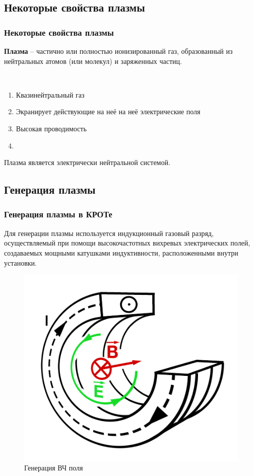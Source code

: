 \documentclass[10pt,pdf,hyperref={unicode}, dvipsnames]{beamer}
\begin{document}
\subsection{Некоторые свойства плазмы}
\begin{frame}
	\frametitle{Некоторые свойства плазмы}
	\textbf{Плазма} -- частично или полностью ионизированный газ, образованный из нейтральных атомов (или молекул) и заряженных частиц.

	$\,$
	\begin{enumerate}
		\item Квазинейтральный газ
		\item Экранирует действующие на неё на неё электрические поля
		\item Высокая проводимость
		\item 
	\end{enumerate}
	Плазма является электрически нейтральной системой.
\end{frame}

\subsection{Генерация плазмы}
\begin{frame}
	\frametitle{Генерация плазмы в КРОТе}
	Для генерации плазмы используется индукционный газовый разряд, осуществляемый при помощи высокочастотных вихревых электрических
	полей, создаваемых мощными катушками индуктивности, расположенными внутри установки.
	\begin{figure}[H]
		\begin{minipage}{\linewidth}
				\centering
				\includegraphics[width=0.4\linewidth]{fig/induct}
				\caption{Генерация ВЧ поля}
				\label{fig:resonator}
		\end{minipage}
		\end{figure}

\end{frame}
\end{document}
